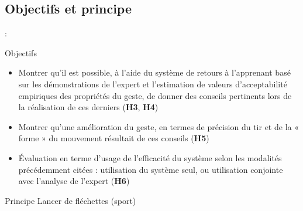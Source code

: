 \documentclass[svgnames]{beamer}
\begin{document}
	\subsection{Objectifs et principe}
	\begin{frame}{\secname : \subsecname}
		\begin{block}{Objectifs}
			\begin{itemize}[label=$\bullet$]
				\item Montrer qu'il est possible, à l'aide du système de retours à l'apprenant basé sur les démonstrations de l'expert et l'estimation de valeurs d'acceptabilité empiriques des propriétés du geste, de donner des conseils pertinents lors de la réalisation de ces derniers (\textbf{H3}, \textbf{H4})
			 	\item Montrer qu'une amélioration du geste, en termes de précision du tir et de la « forme » du mouvement résultait de ces conseils (\textbf{H5})
			 	\item Évaluation en terme d'usage de l'efficacité du système selon les modalités précédemment citées : utilisation du système seul, ou utilisation conjointe avec l'analyse de l'expert (\textbf{H6})
			 \end{itemize}
		\end{block}
	
		\begin{block}{Principe}
			Lancer de fléchettes (sport)
		\end{block}
		
	\end{frame}
	
\end{document}
